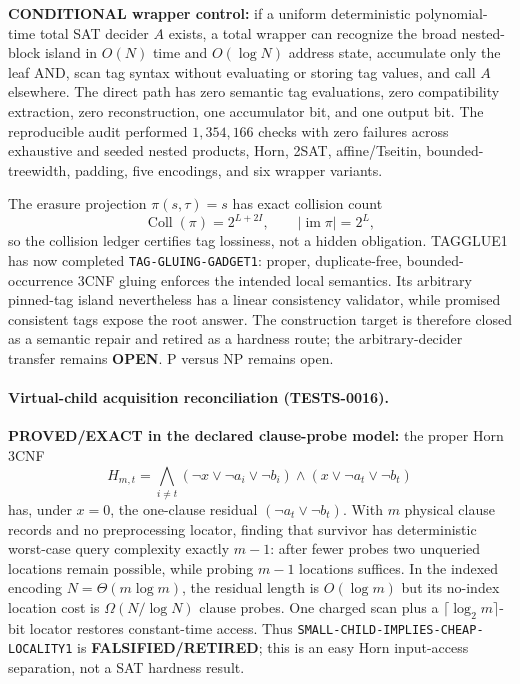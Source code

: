 \documentclass[11pt]{article}
\begin{document}
\textbf{CONDITIONAL wrapper control:} if a uniform deterministic
polynomial-time total SAT decider \(A\) exists, a total wrapper can recognize
the broad nested-block island in \(O(N)\) time and \(O(\log N)\) address state,
accumulate only the leaf AND, scan tag syntax without evaluating or storing tag
values, and call \(A\) elsewhere.  The direct path has zero semantic tag
evaluations, zero compatibility extraction, zero reconstruction, one
accumulator bit, and one output bit.  The reproducible audit performed
\(1{,}354{,}166\) checks with zero failures across exhaustive and seeded
nested products, Horn, 2SAT, affine/Tseitin, bounded-treewidth, padding,
five encodings, and six wrapper variants.

The erasure projection \(\pi(s,\tau)=s\) has exact collision count
\[
 \operatorname{Coll}(\pi)=2^{L+2I},\qquad |\operatorname{im}\pi|=2^L,
\]
so the collision ledger certifies tag lossiness, not a hidden obligation.
TAGGLUE1 has now completed \texttt{TAG-GLUING-GADGET1}: proper,
duplicate-free, bounded-occurrence 3CNF gluing enforces the intended local
semantics. Its arbitrary pinned-tag island nevertheless has a linear
consistency validator, while promised consistent tags expose the root answer.
The construction target is therefore closed as a semantic repair and retired
as a hardness route; the arbitrary-decider transfer remains \textbf{OPEN}.  P versus NP remains open.


\paragraph{Virtual-child acquisition reconciliation (TESTS-0016).}
\textbf{PROVED/EXACT in the declared clause-probe model:} the proper Horn
3CNF
\[
 H_{m,t}=\bigwedge_{i\ne t}(\neg x\vee\neg a_i\vee\neg b_i)
 \wedge(x\vee\neg a_t\vee\neg b_t)
\]
has, under \(x=0\), the one-clause residual
\((\neg a_t\vee\neg b_t)\).  With \(m\) physical clause records and no
preprocessing locator, finding that survivor has deterministic worst-case
query complexity exactly \(m-1\): after fewer probes two unqueried locations
remain possible, while probing \(m-1\) locations suffices.  In the indexed
encoding \(N=\Theta(m\log m)\), the residual length is \(O(\log m)\) but its
no-index location cost is \(\Omega(N/\log N)\) clause probes.  One charged
scan plus a \(\lceil\log_2m\rceil\)-bit locator restores constant-time access.
Thus \texttt{SMALL-CHILD-IMPLIES-CHEAP-LOCALITY1} is
\textbf{FALSIFIED/RETIRED}; this is an easy Horn input-access separation, not
a SAT hardness result.
\end{document}
